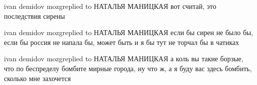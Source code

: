 ivan demidov mozgreplied to НАТАЛЬЯ МАНИЦКАЯ
вот считай, это последствия сирены

ivan demidov mozgreplied to НАТАЛЬЯ МАНИЦКАЯ
если бы сирен не было бы, если бы россия не напала бы, может быть и я бы тут не торчал бы в чатиках

ivan demidov mozgreplied to НАТАЛЬЯ МАНИЦКАЯ
а коль вы такие борзые, что по беспределу бомбите мирные города, ну что ж, а я буду вас здесь бомбить, сколько мне захочется
















